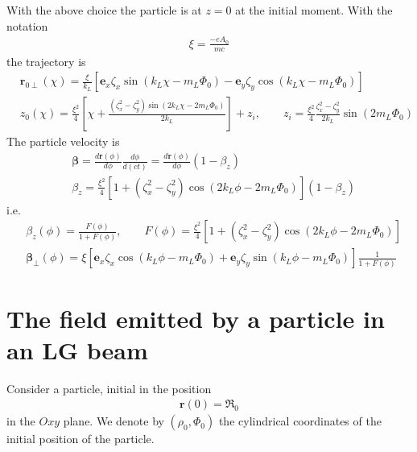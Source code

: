 With the above choice the particle is at $z=0$ at the initial moment. With the notation
\begin{align}
    \xi = \frac{-e A_0}{mc}
\end{align}
the trajectory is
\begin{align}
     & {\bm r}_{0\perp}(\chi)=\frac{\xi}{k_L}\left[{\bm e}_x\zeta_x\sin(k_L\chi-m_L\varPhi_0)-{\bm e}_y\zeta_y\cos(k_L\chi-m_L\varPhi_0)\right]                                                  \\
     & z_0(\chi)=\frac{\xi^2}4\left[\chi+\frac{(\zeta_x^2-\zeta_y^2)\sin(2k_L\chi-2m_L\varPhi_0)}{2k_L}\right]+z_i,\qquad z_i = \frac{\xi^2}4\frac{\zeta_x^2-\zeta_y^2}{2k_L}\sin(2m_L\varPhi_0)
\end{align}
The particle velocity is
\begin{align}
     & {\boldsymbol\beta}=\frac{d{\bm r}(\phi)}{d\phi}\frac{d\phi}{d (ct)}=\frac{d{\bm r}(\phi)}{d\phi}(1-\beta_z) \\
     & \beta_z =\frac{\xi^2}4\left[1+(\zeta_x^2-\zeta_y^2)\cos(2k_L\phi-2m_L\varPhi_0)\right](1-\beta_z)
\end{align}
i.e.
\begin{align}
     & \beta_z(\phi) =\frac{F(\phi)}{1+F(\phi)},\qquad F(\phi) = \frac{\xi^2}4\left[1+(\zeta_x^2-\zeta_y^2)\cos(2k_L\phi-2m_L\varPhi_0)\right]                 \\
     & {\boldsymbol{\beta}}_\perp(\phi)=\xi\left[{\bm e}_x\zeta_x\cos(k_L\phi-m_L\varPhi_0)+{\bm e}_y\zeta_y\sin(k_L\phi-m_L\varPhi_0)\right]\frac1{1+F(\phi)}
\end{align}

\section{The field emitted by a particle in an LG beam}

Consider a particle, initial in the position
\begin{align}
    {\bm r}(0) = {\boldsymbol{\mathfrak R}}_0
\end{align}
in the $Oxy$ plane. We denote by $(\rho_0, \varPhi_0)$ the cylindrical coordinates of the initial position of the particle.

